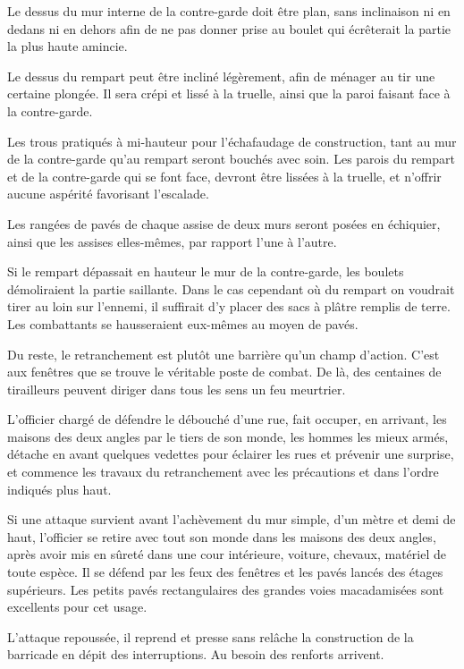 \documentclass[french,twoside]{book} %
\begin{document}
Le dessus du mur interne de la contre-garde doit être plan, sans inclinaison ni en dedans ni en dehors afin de ne pas donner prise au boulet qui écrêterait la partie la plus haute amincie.\par
Le dessus du rempart peut être incliné légèrement, afin de ménager au tir une certaine plongée. Il sera crépi et lissé à la truelle, ainsi que la paroi faisant face à la contre-garde.\par
Les trous pratiqués à mi-hauteur pour l’échafaudage de construction, tant au mur de la contre-garde qu’au rempart seront bouchés avec soin. Les parois du rempart et de la contre-garde qui se font face, devront être lissées à la truelle, et n’offrir aucune aspérité favorisant l’escalade.\par
Les rangées de pavés de chaque assise de deux murs seront posées en échiquier, ainsi que les assises elles-mêmes, par rapport l’une à l’autre.\par
Si le rempart dépassait en hauteur le mur de la contre-garde, les boulets démoliraient la partie saillante. Dans le cas cependant où du rempart on voudrait tirer au loin sur l’ennemi, il suffirait d’y placer des sacs à plâtre remplis de terre. Les combattants se hausseraient eux-mêmes au moyen de pavés.\par
Du reste, le retranchement est plutôt une barrière qu’un champ d’action. C'est aux fenêtres que se trouve le véritable poste de combat. De là, des centaines de tirailleurs peuvent diriger dans tous les sens un feu meurtrier.\par
L'officier chargé de défendre le débouché d’une rue, fait occuper, en arrivant, les maisons des deux angles par le tiers de son monde, les hommes les mieux armés, détache en avant quelques vedettes pour éclairer les rues et prévenir une surprise, et commence les travaux du retranchement avec les précautions et dans l’ordre indiqués plus haut.\par
Si une attaque survient avant l’achèvement du mur simple, d’un mètre et demi de haut, l’officier se retire avec tout son monde dans les maisons des deux angles, après avoir mis en sûreté dans une cour intérieure, voiture, chevaux, matériel de toute espèce. Il se défend par les feux des fenêtres et les pavés lancés des étages supérieurs. Les petits pavés rectangulaires des grandes voies macadamisées sont excellents pour cet usage.\par
L'attaque repoussée, il reprend et presse sans relâche la construction de la barricade en dépit des interruptions. Au besoin des renforts arrivent.\par
\end{document}
